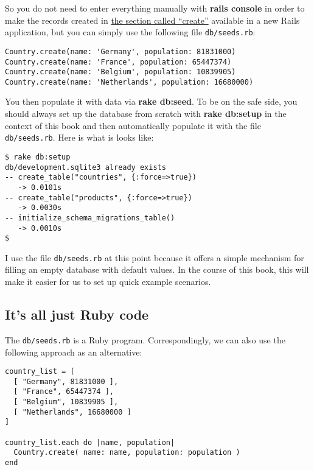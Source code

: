 \documentclass[a4paper]{book}
\newcounter{tab}[chapter]
\begin{document}
So you do not need to enter everything manually with \textbf{rails console} in order to make the records created in \hyperref[activerecordux5fcreate]{the section called “create”} available in a new Rails application, but you can simply use the following file \texttt{db/seeds.rb}:

\begin{shaded}\begin{verbatim}
Country.create(name: 'Germany', population: 81831000)
Country.create(name: 'France', population: 65447374)
Country.create(name: 'Belgium', population: 10839905)
Country.create(name: 'Netherlands', population: 16680000)
\end{verbatim}\end{shaded}

You then populate it with data via \textbf{rake db:seed}. To be on the safe side, you should always set up the database from scratch with \textbf{rake db:setup} in the context of this book and then automatically populate it with the file \texttt{db/seeds.rb}. Here is what is looks like:

\begin{shaded}\begin{verbatim}
$ rake db:setup
db/development.sqlite3 already exists
-- create_table("countries", {:force=>true})
   -> 0.0101s
-- create_table("products", {:force=>true})
   -> 0.0030s
-- initialize_schema_migrations_table()
   -> 0.0010s
$
\end{verbatim}\end{shaded}

I use the file \texttt{db/seeds.rb} at this point because it offers a simple mechanism for filling an empty database with default values. In the course of this book, this will make it easier for us to set up quick example scenarios.

\subsection{It's all just Ruby code}\label{its-all-just-ruby-code}

The \texttt{db/seeds.rb} is a Ruby program. Correspondingly, we can also use the following approach as an alternative:

\begin{shaded}\begin{verbatim}
country_list = [
  [ "Germany", 81831000 ],
  [ "France", 65447374 ],
  [ "Belgium", 10839905 ],
  [ "Netherlands", 16680000 ]
]

country_list.each do |name, population|
  Country.create( name: name, population: population )
end
\end{verbatim}\end{shaded}
\end{document}
